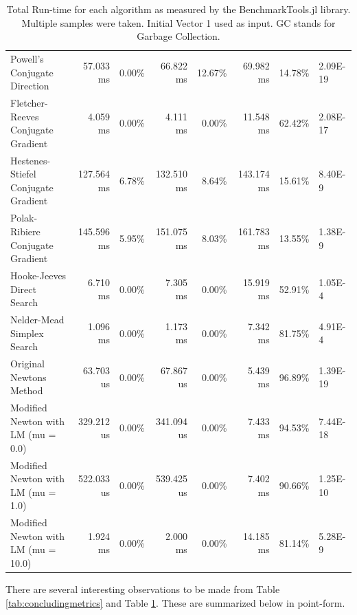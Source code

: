 \documentclass{article}
\begin{document}
\begin{table}[H]
{\begin{tabular}{@{}lrrrrrrl@{}}
    Powell's Conjugate Direction        & 57.033 ms  & 0.00\%  & 66.822 ms  & 12.67\% & 69.982 ms  & 14.78\% & 2.09E-19 \\
    Fletcher-Reeves Conjugate Gradient  & 4.059 ms   & 0.00\%  & 4.111 ms   & 0.00\%  & 11.548 ms  & 62.42\% & 2.08E-17 \\
    Hestenes-Stiefel Conjugate Gradient & 127.564 ms & 6.78\%  & 132.510 ms & 8.64\%  & 143.174 ms & 15.61\% & 8.40E-9  \\
    Polak-Ribiere Conjugate Gradient    & 145.596 ms & 5.95\%  & 151.075 ms & 8.03\%  & 161.783 ms & 13.55\% & 1.38E-9  \\
    Hooke-Jeeves Direct Search          & 6.710 ms   & 0.00\%  & 7.305 ms   & 0.00\%  & 15.919 ms  & 52.91\% & 1.05E-4  \\
    Nelder-Mead Simplex Search          & 1.096 ms   & 0.00\%  & 1.173 ms   & 0.00\%  & 7.342 ms   & 81.75\% & 4.91E-4  \\
    Original Newtons Method             & 63.703 us  & 0.00\%  & 67.867 us  & 0.00\%  & 5.439 ms   & 96.89\% & 1.39E-19 \\
    Modified Newton with LM (mu = 0.0)  & 329.212 us & 0.00\%  & 341.094 us & 0.00\%  & 7.433 ms   & 94.53\% & 7.44E-18 \\
    Modified Newton with LM (mu = 1.0)  & 522.033 us & 0.00\%  & 539.425 us & 0.00\%  & 7.402 ms   & 90.66\% & 1.25E-10 \\
    Modified Newton with LM (mu = 10.0) & 1.924 ms   & 0.00\%  & 2.000 ms   & 0.00\%  & 14.185 ms  & 81.14\% & 5.28E-9  \\ \bottomrule
    \end{tabular}%
    }
    \caption{Total Run-time for each algorithm as measured by the BenchmarkTools.jl library. Multiple samples were taken. Initial Vector 1 used as input. GC stands for Garbage Collection.}
    \label{tab:concludingtimings}
    \end{table}

    There are several interesting observations to be made from Table \ref{tab:concludingmetrics} and Table \ref{tab:concludingtimings}. These are summarized below in point-form.
\end{document}

